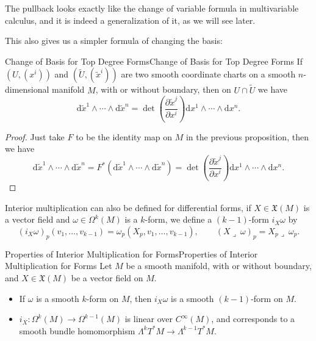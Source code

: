 \documentclass[../main.tex]{subfiles}
\begin{document}
The pullback looks exactly like the change of variable formula in multivariable calculus, and it is indeed a generalization of it, as we will see later.

This also gives us a simpler formula of changing the basis:
\begin{proposition}{Change of Basis for Top Degree Forms}{Change of Basis for Top Degree Forms}
  If $(U, (x^i))$ and $(\tilde{U}, (\tilde{x}^i))$ are two smooth coordinate charts on a smooth $n$-dimensional manifold $M$, with or without boundary, then on $U \cap \tilde{U}$ we have
  \begin{equation}
    \mathrm{d} \tilde{x}^1 \wedge \cdots \wedge \mathrm{d} \tilde{x}^n = \det \left(\frac{\partial \tilde{x}^j}{\partial x^i}\right) \mathrm{d} x^1 \wedge \cdots \wedge \mathrm{d} x^n.
  \end{equation}  
\end{proposition}
\begin{proof}
  Just take $F$ to be the identity map on $M$ in the previous proposition, then we have
  \begin{equation*}
    \mathrm{d} \tilde{x}^1 \wedge \cdots \wedge \mathrm{d} \tilde{x}^n = F^*(\mathrm{d} \tilde{x}^1 \wedge \cdots \wedge \mathrm{d} \tilde{x}^n) = \det \left(\frac{\partial \tilde{x}^j}{\partial x^i}\right) \mathrm{d} x^1 \wedge \cdots \wedge \mathrm{d} x^n.
  \end{equation*}
\end{proof}

Interior multiplication can also be defined for differential forms, if $X \in \mathfrak{X}(M)$ is a vector field and $\omega \in \Omega^k(M)$ is a $k$-form, we define a $(k-1)$-form $i_X \omega$ by
\begin{equation*}
  (i_X \omega)_p(v_1, \dots, v_{k-1}) = \omega_p(X_p, v_1, \dots, v_{k-1}), \qquad (X \lrcorner \ \omega)_p = X_p \lrcorner \ \omega_p.
\end{equation*}

\begin{proposition}{Properties of Interior Multiplication for Forms}{Properties of Interior Multiplication for Forms}
  Let $M$ be a smooth manifold, with or without boundary, and $X \in \mathfrak{X}(M)$ be a vector field on $M$.
  \begin{itemize}
    \item If $\omega$ is a smooth $k$-form on $M$, then $i_X \omega$ is a smooth $(k-1)$-form on $M$.
    \item $i_X: \Omega^k(M) \to \Omega^{k-1}(M)$ is linear over $C^\infty(M)$, and corresponds to a smooth bundle homomorphism $\Lambda^k T^*M \to \Lambda^{k-1} T^*M$.
  \end{itemize}
\end{proposition}
\end{document}
